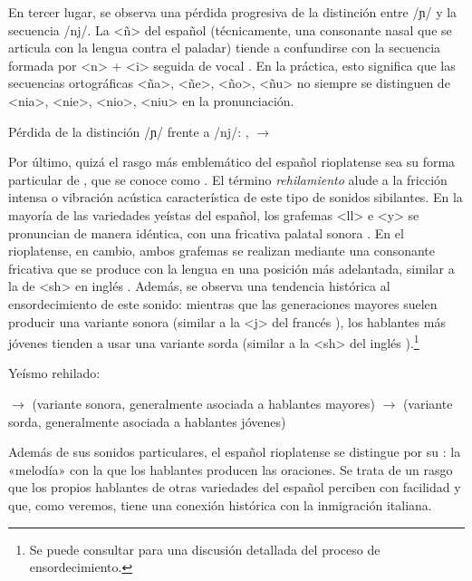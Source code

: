 En tercer lugar, se observa una pérdida progresiva de la distinción entre /ɲ/ y
la secuencia /nj/. La <ñ> del español (técnicamente, una consonante nasal que se
articula con la lengua contra el paladar) tiende a confundirse con la secuencia
formada por <n> + <i> seguida de vocal
\parencite{colantoni2013hualde,bongiovanni2015}. En la práctica, esto significa
que las secuencias ortográficas <ña>, <ñe>, <ño>, <ñu> no siempre se distinguen
de <nia>, <nie>, <nio>, <niu> en la pronunciación.

\begin{exe}
  \ex\label{ex:15-nj} Pérdida de la distinción /ɲ/ frente a /nj/:
      ,  $\rightarrow$ 
\end{exe}

Por último, quizá el rasgo más emblemático del español rioplatense sea su forma
particular de , que se conoce como . El
término \textit{rehilamiento} alude a la fricción intensa o vibración acústica
característica de este tipo de sonidos sibilantes. En la mayoría de las
variedades yeístas del español, los grafemas <ll> e <y> se pronuncian de manera
idéntica, con una fricativa palatal sonora . En el rioplatense, en cambio,
ambos grafemas se realizan mediante una consonante fricativa que se produce con
la lengua en una posición más adelantada, similar a la de <sh> en inglés
\parencite[entre muchos otros]{zamora1949,guitarte1955}. Además, se observa una
tendencia histórica al ensordecimiento de este sonido: mientras que las
generaciones mayores suelen producir una variante sonora  (similar a la
<j> del francés ), los hablantes más jóvenes tienden a usar una
variante sorda  (similar a la <sh> del inglés ).\footnote{Se
puede consultar \textcite{rohena2013} para una discusión detallada del proceso de
ensordecimiento.}

\begin{exe}
  \ex\label{ex:15-rehilado} Yeísmo rehilado:
    \begin{xlist}
      \ex {} $\rightarrow$  (variante sonora,
          generalmente asociada a hablantes mayores)
      \ex {} $\rightarrow$  (variante sorda,
          generalmente asociada a hablantes jóvenes)
    \end{xlist}
\end{exe}

Además de sus sonidos particulares, el español rioplatense se distingue por su
: la «melodía» con la que los hablantes producen las
oraciones. Se trata de un rasgo que los propios hablantes de otras variedades del
español perciben con facilidad y que, como veremos, tiene una conexión histórica
con la inmigración italiana.

